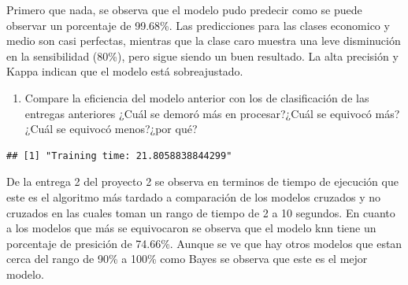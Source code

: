 \documentclass[
]{article}
\providecommand{\tightlist}{%
  \setlength{\itemsep}{0pt}\setlength{\parskip}{0pt}}
\begin{document}
Primero que nada, se observa que el modelo pudo predecir como se puede
observar un porcentaje de 99.68\%. Las predicciones para las clases
economico y medio son casi perfectas, mientras que la clase caro muestra
una leve disminución en la sensibilidad (80\%), pero sigue siendo un
buen resultado. La alta precisión y Kappa indican que el modelo está
sobreajustado.

\begin{enumerate}
\def\labelenumi{\arabic{enumi}.}
\setcounter{enumi}{10}
\tightlist
\item
  Compare la eficiencia del modelo anterior con los de clasificación de
  las entregas anteriores ¿Cuál se demoró más en procesar?¿Cuál se
  equivocó más?¿Cuál se equivocó menos?¿por qué?
\end{enumerate}

\begin{verbatim}
## [1] "Training time: 21.8058838844299"
\end{verbatim}

De la entrega 2 del proyecto 2 se observa en terminos de tiempo de
ejecución que este es el algoritmo más tardado a comparación de los
modelos cruzados y no cruzados en las cuales toman un rango de tiempo de
2 a 10 segundos. En cuanto a los modelos que más se equivocaron se
observa que el modelo knn tiene un porcentaje de presición de 74.66\%.
Aunque se ve que hay otros modelos que estan cerca del rango de 90\% a
100\% como Bayes se observa que este es el mejor modelo.
\end{document}

